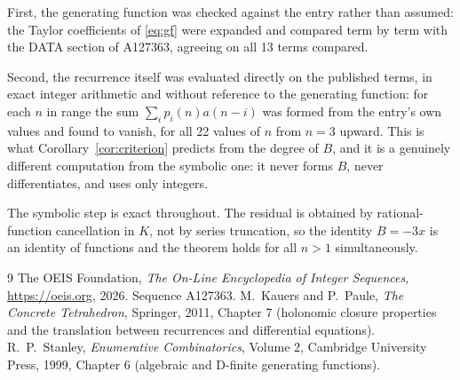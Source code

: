 \documentclass[11pt,a4paper]{article}
\theoremstyle{plain}
\theoremstyle{definition}
\begin{document}
First, the generating function was checked against the entry rather than assumed: the
Taylor coefficients of \eqref{eq:gf} were expanded and compared term by term with the DATA
section of A127363, agreeing on all 13 terms compared.

Second, the recurrence itself was evaluated directly on the published terms, in exact
integer arithmetic and without reference to the generating function: for each $n$ in range
the sum $\sum_{i}p_{i}(n)a(n-i)$ was formed from the entry's own values and found to
vanish, for all 22 values of $n$ from $n=3$ upward. This is what
Corollary~\ref{cor:criterion} predicts from the degree of $B$, and it is a genuinely
different computation from the symbolic one: it never forms $B$, never differentiates, and
uses only integers.

The symbolic step is exact throughout. The residual is obtained by rational-function
cancellation in $K$, not by series truncation, so the identity $B=- 3 x$ is an
identity of functions and the theorem holds for all $n>1$ simultaneously.

\begin{thebibliography}{9}
 The OEIS Foundation, \emph{The On-Line Encyclopedia of Integer Sequences},
\url{https://oeis.org}, 2026. Sequence A127363.
 M.~Kauers and P.~Paule, \emph{The Concrete Tetrahedron}, Springer, 2011,
Chapter 7 (holonomic closure properties and the translation between recurrences and
differential equations).
 R.~P.~Stanley, \emph{Enumerative Combinatorics}, Volume 2, Cambridge
University Press, 1999, Chapter 6 (algebraic and D-finite generating functions).
\end{thebibliography}
\end{document}
